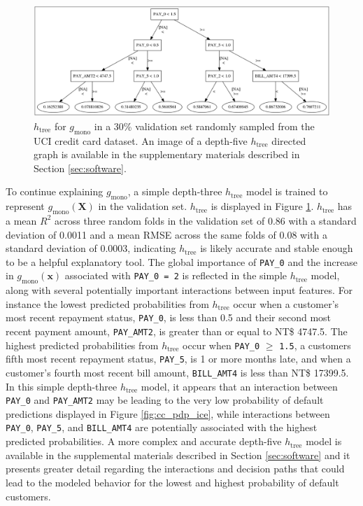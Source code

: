 \documentclass[11pt]{asaproc}
\begin{document}
\vspace{10pt}

\begin{figure}[htb]
	\begin{center}
		\includegraphics[scale=0.3]{img/figure_9.eps}
		\caption{$h_{\text{tree}}$ for $g_{\text{mono}}$ in a 30\% validation set randomly sampled from the UCI credit card dataset. An image of a depth-five $h_{\text{tree}}$ directed graph is available in the supplementary materials described in Section \ref{sec:software}.}
		\label{fig:cc_dt_surrogate}
	\end{center}
\end{figure}

To continue explaining $g_{\text{mono}}$, a simple depth-three $h_{\text{tree}}$ model is trained to represent  $g_{\text{mono}}(\mathbf{X})$ in the validation set. $h_{\text{tree}}$ is displayed in Figure \ref{fig:cc_dt_surrogate}. $h_{\text{tree}}$ has a mean $R^2$ across three random folds in the validation set of 0.86 with a standard deviation of 0.0011 and a mean RMSE across the same folds of 0.08 with a standard deviation of 0.0003, indicating $h_{\text{tree}}$ is likely accurate and stable enough to be a helpful explanatory tool. The global importance of \texttt{PAY\_0} and the increase in $g_{\text{mono}}(\mathbf{x})$ associated with \texttt{PAY\_0 = 2} is reflected in the simple $h_{\text{tree}}$ model, along with several potentially important interactions between input features. For instance the lowest predicted probabilities from $h_{\text{tree}}$ occur when a customer's  most recent repayment status, \texttt{PAY\_0}, is less than 0.5 and their second most recent payment amount, \texttt{PAY\_AMT2}, is greater than or equal to NT\$ 4747.5. The highest predicted probabilities from $h_{\text{tree}}$ occur when \texttt{PAY\_0} $\geq$ \texttt{1.5}, a customers fifth most recent repayment status, \texttt{PAY\_5}, is 1 or more months late, and when a customer's fourth most recent bill amount, \texttt{BILL\_AMT4} is less than NT\$ 17399.5. In this simple depth-three $h_{\text{tree}}$ model, it appears that an interaction between \texttt{PAY\_0} and \texttt{PAY\_AMT2} may be leading to the very low probability of default predictions displayed in Figure \ref{fig:cc_pdp_ice}, while interactions between \texttt{PAY\_0}, \texttt{PAY\_5}, and \texttt{BILL\_AMT4} are potentially associated with the highest predicted probabilities. A more complex and accurate depth-five $h_{\text{tree}}$ model is available in the supplemental materials described in Section \ref{sec:software} and it presents greater detail regarding the interactions and decision paths that could lead to the modeled behavior for the lowest and highest probability of default customers. 
 
\end{document}
